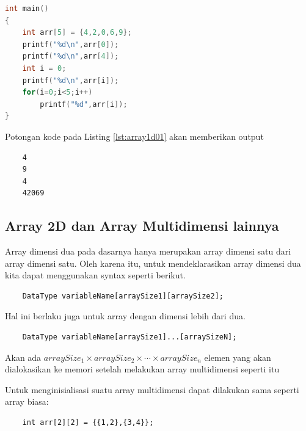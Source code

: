 \begin{lstlisting}[language=c,caption = Contoh Mengakses Array 1D,label=lst:array1d01]
int main()
{
    int arr[5] = {4,2,0,6,9};
    printf("%d\n",arr[0]);
    printf("%d\n",arr[4]);
    int i = 0;
    printf("%d\n",arr[i]);
    for(i=0;i<5;i++)
        printf("%d",arr[i]);
}
\end{lstlisting}

Potongan kode pada Listing \ref{lst:array1d01} akan memberikan output
\begin{verbatim}
    4
    9
    4
    42069
\end{verbatim}

\subsection{Array 2D dan Array Multidimensi lainnya}%
Array dimensi dua pada dasarnya hanya merupakan array dimensi satu dari array dimensi satu. Oleh karena itu, untuk mendeklarasikan array dimensi dua kita dapat menggunakan syntax seperti berikut.
\begin{verbatim}
	DataType variableName[arraySize1][arraySize2];
\end{verbatim}
Hal ini berlaku juga untuk array dengan dimensi lebih dari dua.
\begin{verbatim}
    DataType variableName[arraySize1]...[arraySizeN];
\end{verbatim}
Akan ada $arraySize_1\times arraySize_2 \times \cdots \times arraySize_n$ elemen yang akan dialokasikan ke memori setelah melakukan array multidimensi seperti itu

Untuk menginisialisasi suatu array multidimensi dapat dilakukan sama seperti array biasa:
\begin{verbatim}
    int arr[2][2] = {{1,2},{3,4}};
\end{verbatim}

